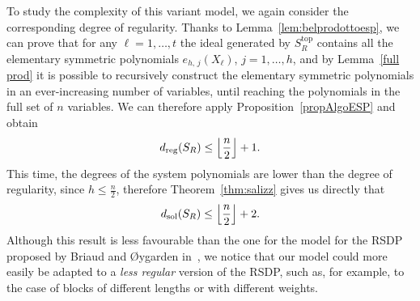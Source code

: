 \documentclass[11pt]{article}
\newcommand{\es}[2]{e_{#1,\, #2}}
\DeclarePairedDelimiter{\fl}{\lfloor}{\rfloor}
\theoremstyle{plain}
\theoremstyle{definition}
\theoremstyle{remark}
\begin{document}
To study the complexity of this variant model, we again consider the corresponding degree of regularity. Thanks to Lemma~\ref{lem:belprodottoesp}, we can prove that for any $\ell=1,\dots,t$ the ideal generated by $S_R^{\operatorname{top}}$ contains all the elementary symmetric polynomials $\es{h}{j}(X_\ell)$, $j=1,\dots,h$, and by Lemma~\ref{full prod} it is possible to recursively construct the elementary symmetric polynomials in an ever-increasing number of variables, until reaching the polynomials in the full set of $n$ variables. We can therefore apply Proposition~\ref{propAlgoESP} and obtain
\begin{equation*}
    d_{\operatorname{reg}}(S_R)\leq\fl*{\frac{n}{2}}+1.
\end{equation*}
This time, the degrees of the system polynomials are lower than the degree of regularity, since $h\leq\frac{n}{2}$, therefore Theorem~\ref{thm:salizz} gives us directly that
\begin{equation*}
    d_{\operatorname{sol}}(S_R)\leq\fl*{\frac{n}{2}}+2.
\end{equation*}
Although this result is less favourable than the one for the model for the RSDP proposed by Briaud and \O{}ygarden in~\cite{10.1007/978-3-031-30589-4_14}, we notice that our model could more easily be adapted to a \textit{less regular} version of the RSDP, such as, for example, to the case of blocks of different lengths or with different weights.

\printbibliography
\end{document}
